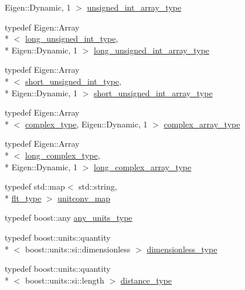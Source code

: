 \begin{DoxyCompactItemize}
Eigen\-::\-Dynamic, 1 $>$ \hyperlink{namespaceIceBRG_ae27e6046fd8aeb0c4451b4836a03b31f}{unsigned\-\_\-int\-\_\-array\-\_\-type}
\item 
typedef Eigen\-::\-Array\\*
$<$ \hyperlink{lib_2IceBRG__main_2common_8h_a2841818dd07dccd18e6f99e0224a049c}{long\-\_\-unsigned\-\_\-int\-\_\-type}, \\*
Eigen\-::\-Dynamic, 1 $>$ \hyperlink{namespaceIceBRG_aceb755f0ad553ba8e208e6d6d3855c97}{long\-\_\-unsigned\-\_\-int\-\_\-array\-\_\-type}
\item 
typedef Eigen\-::\-Array\\*
$<$ \hyperlink{lib_2IceBRG__main_2common_8h_a244cb886c75b7f7021c7f2bc416ec5f9}{short\-\_\-unsigned\-\_\-int\-\_\-type}, \\*
Eigen\-::\-Dynamic, 1 $>$ \hyperlink{namespaceIceBRG_a7acb9cc3ca6afdd487166f5c720a308c}{short\-\_\-unsigned\-\_\-int\-\_\-array\-\_\-type}
\item 
typedef Eigen\-::\-Array\\*
$<$ \hyperlink{lib_2IceBRG__main_2common_8h_a2ffd8cd4a164cbda79695e6c1029a44a}{complex\-\_\-type}, Eigen\-::\-Dynamic, 1 $>$ \hyperlink{namespaceIceBRG_a02e79930ea75411b7883d2786b2fc5d7}{complex\-\_\-array\-\_\-type}
\item 
typedef Eigen\-::\-Array\\*
$<$ \hyperlink{lib_2IceBRG__main_2common_8h_ab3b5c20fe2722eb08a444f2c268752da}{long\-\_\-complex\-\_\-type}, \\*
Eigen\-::\-Dynamic, 1 $>$ \hyperlink{namespaceIceBRG_acf641fef465eff0b8d32ec8895129d26}{long\-\_\-complex\-\_\-array\-\_\-type}
\item 
typedef std\-::map$<$ std\-::string, \\*
\hyperlink{lib_2IceBRG__main_2common_8h_ad0f130a56eeb944d9ef2692ee881ecc4}{flt\-\_\-type} $>$ \hyperlink{namespaceIceBRG_a7dff9bcf80d56e9e3fc9d9e25c89ae68}{unitconv\-\_\-map}
\item 
typedef boost\-::any \hyperlink{namespaceIceBRG_a3101fc159e191fa99c4ec14e445df96e}{any\-\_\-units\-\_\-type}
\item 
typedef boost\-::units\-::quantity\\*
$<$ boost\-::units\-::si\-::dimensionless $>$ \hyperlink{namespaceIceBRG_a9ae604a735e60597c32674c8cd07706f}{dimensionless\-\_\-type}
\item 
typedef boost\-::units\-::quantity\\*
$<$ boost\-::units\-::si\-::length $>$ \hyperlink{namespaceIceBRG_a45499647eb87e24c10ab32c628711cec}{distance\-\_\-type}

\end{DoxyCompactItemize}
